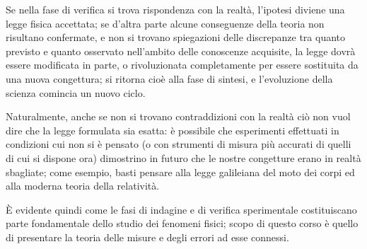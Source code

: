 Se nella fase di verifica si trova rispondenza con la
realt\`a, l'ipotesi diviene una legge fisica accettata; se
d'altra parte alcune conseguenze della teoria non risultano
confermate, e non si trovano spiegazioni delle discrepanze
tra quanto previsto e quanto osservato nell'ambito delle
conoscenze acquisite, la legge dovr\`a essere modificata in
parte, o rivoluzionata completamente per essere sostituita
da una nuova congettura; si ritorna cio\`e alla fase di
sintesi, e l'evoluzione della scienza comincia un nuovo
ciclo.

Naturalmente, anche se non si trovano contraddizioni con la
realt\`a ci\`o non vuol dire che la legge formulata sia
esatta: \`e possibile che esperimenti effettuati in
condizioni cui non si \`e pensato (o con strumenti di misura
pi\`u accurati di quelli di cui si dispone ora) dimostrino
in futuro che le nostre congetture erano in realt\`a
sbagliate; come esempio, basti pensare alla legge galileiana
del moto dei corpi ed alla moderna teoria della
relativit\`a.

\`E evidente quindi come le fasi di indagine e di verifica
sperimentale costituiscano parte fondamentale dello studio
dei fenomeni fisici; scopo di questo corso \`e quello di
presentare la teoria delle misure e degli
errori ad esse connessi.%

\endinput
